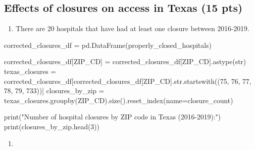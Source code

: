 \documentclass[
  letterpaper,
  DIV=11,
  numbers=noendperiod]{scrartcl}
\newenvironment{Shaded}{\begin{snugshade}}{\end{snugshade}}
\newcommand{\NormalTok}[1]{\textcolor[rgb]{0.00,0.23,0.31}{#1}}
\providecommand{\tightlist}{%
  \setlength{\itemsep}{0pt}\setlength{\parskip}{0pt}}\usepackage{longtable,booktabs,array}
\begin{document}
\subsection{Effects of closures on access in Texas (15
pts)}\label{effects-of-closures-on-access-in-texas-15-pts}

\begin{enumerate}
\def\labelenumi{\arabic{enumi}.}
\tightlist
\item
  There are 20 hospitals that have had at least one closure between
  2016-2019.
\end{enumerate}

\begin{Shaded}
\begin{Highlighting}[]
\NormalTok{corrected\_closures\_df = pd.DataFrame(properly\_closed\_hospitals)}

\NormalTok{corrected\_closures\_df[\textquotesingle{}ZIP\_CD\textquotesingle{}] = corrected\_closures\_df[\textquotesingle{}ZIP\_CD\textquotesingle{}].astype(str)}
\NormalTok{texas\_closures = corrected\_closures\_df[corrected\_closures\_df[\textquotesingle{}ZIP\_CD\textquotesingle{}].str.startswith((\textquotesingle{}75\textquotesingle{}, \textquotesingle{}76\textquotesingle{}, \textquotesingle{}77\textquotesingle{}, \textquotesingle{}78\textquotesingle{}, \textquotesingle{}79\textquotesingle{}, \textquotesingle{}733\textquotesingle{}))]}
\NormalTok{closures\_by\_zip = texas\_closures.groupby(\textquotesingle{}ZIP\_CD\textquotesingle{}).size().reset\_index(name=\textquotesingle{}closure\_count\textquotesingle{})}

\NormalTok{print("Number of hospital closures by ZIP code in Texas (2016{-}2019):")}
\NormalTok{print(closures\_by\_zip.head(3))}
\end{Highlighting}
\end{Shaded}

\begin{enumerate}
\def\labelenumi{\arabic{enumi}.}
\setcounter{enumi}{1}
\tightlist
\item
\end{enumerate}
\end{document}
